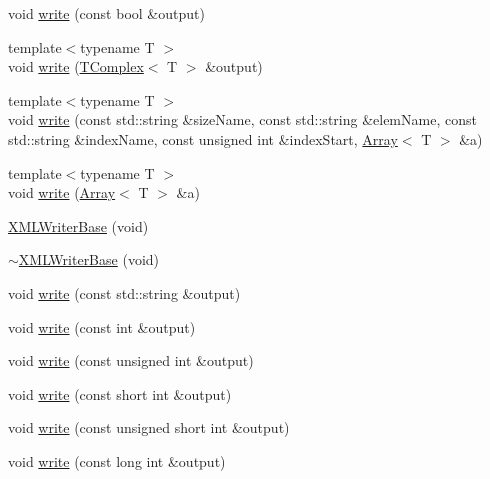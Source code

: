 \begin{DoxyCompactItemize}
\item 
void \mbox{\hyperlink{classXMLWriterAPI_1_1XMLWriterBase_ac9c7d2ed0127b4dd05b4b3c0225d9f34}{write}} (const bool \&output)
\item 
{\footnotesize template$<$typename T $>$ }\\void \mbox{\hyperlink{classXMLWriterAPI_1_1XMLWriterBase_a00b5edcaf39f8bdaf2aa5eed7118c8e7}{write}} (\mbox{\hyperlink{classXMLTComplex_1_1TComplex}{T\+Complex}}$<$ T $>$ \&output)
\item 
{\footnotesize template$<$typename T $>$ }\\void \mbox{\hyperlink{classXMLWriterAPI_1_1XMLWriterBase_a85d9236f5ec6ccc3c8559d4ec431bf6b}{write}} (const std\+::string \&size\+Name, const std\+::string \&elem\+Name, const std\+::string \&index\+Name, const unsigned int \&index\+Start, \mbox{\hyperlink{classXMLArray_1_1Array}{Array}}$<$ T $>$ \&a)
\item 
{\footnotesize template$<$typename T $>$ }\\void \mbox{\hyperlink{classXMLWriterAPI_1_1XMLWriterBase_a5475e21d716c65a21d620b4cde0c9ca1}{write}} (\mbox{\hyperlink{classXMLArray_1_1Array}{Array}}$<$ T $>$ \&a)
\item 
\mbox{\hyperlink{classXMLWriterAPI_1_1XMLWriterBase_a1620cf7f4428110d2d77b4324293512e}{X\+M\+L\+Writer\+Base}} (void)
\item 
\mbox{\hyperlink{classXMLWriterAPI_1_1XMLWriterBase_a63581e812eb79dbd0e7c8c7574fb73b4}{$\sim$\+X\+M\+L\+Writer\+Base}} (void)
\item 
void \mbox{\hyperlink{classXMLWriterAPI_1_1XMLWriterBase_abc9cd8491179aa022c9b63053f3a7ff8}{write}} (const std\+::string \&output)
\item 
void \mbox{\hyperlink{classXMLWriterAPI_1_1XMLWriterBase_a1c18e91f826057d97bb0d46b9224a830}{write}} (const int \&output)
\item 
void \mbox{\hyperlink{classXMLWriterAPI_1_1XMLWriterBase_a38ff4598155037e936a3a5473fd9d437}{write}} (const unsigned int \&output)
\item 
void \mbox{\hyperlink{classXMLWriterAPI_1_1XMLWriterBase_ac9d330a3600ca9d1ecba541e82919f09}{write}} (const short int \&output)
\item 
void \mbox{\hyperlink{classXMLWriterAPI_1_1XMLWriterBase_abea743f6c1788ff4dc2b8458a01071e0}{write}} (const unsigned short int \&output)
\item 
void \mbox{\hyperlink{classXMLWriterAPI_1_1XMLWriterBase_a84c6c305fdfee1688465eaa73740f7e7}{write}} (const long int \&output)
\item 

\end{DoxyCompactItemize}
